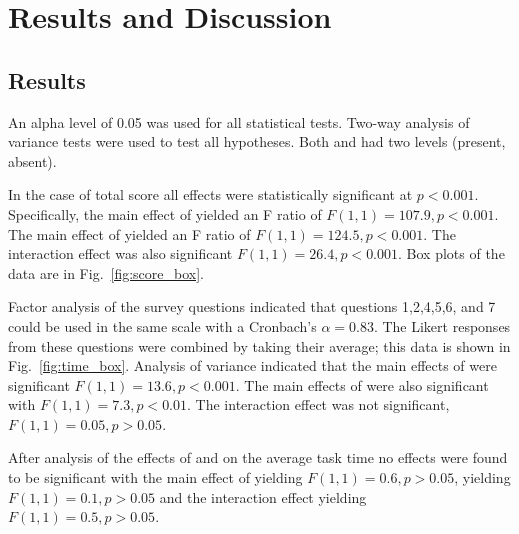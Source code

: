 \section{Results and Discussion} \label{sec:results}
\subsection{Results}
An alpha level of 0.05 was used for all statistical tests. Two-way analysis of variance tests were used to test all hypotheses. Both \xQ{} and \xO had two levels (present, absent).

In the case of total score all effects were statistically significant at $p<0.001$. Specifically, the main effect of \xQ{} yielded an F ratio of $F(1,1)=107.9, p<0.001$. The main effect of \xO{} yielded an F ratio of $F(1,1)=124.5,p<0.001$. The interaction effect was also significant $F(1,1)=26.4,p<0.001$. Box plots of the data are in Fig.~\ref{fig:score_box}.

Factor analysis of the survey questions indicated that questions 1,2,4,5,6, and 7 could be used in the same scale with a Cronbach's $\alpha = 0.83$. The Likert responses from these questions were combined by taking their average; this data is shown in Fig.~\ref{fig:time_box}. Analysis of variance indicated that the main effects of \xQ{} were significant $F(1,1)=13.6,p<0.001$. The main effects of \xO{} were also significant with $F(1,1)=7.3,p<0.01$. The interaction effect was not significant, $F(1,1)=0.05,p>0.05$.

After analysis of the effects of \xQ{} and \xO{} on the average task time no effects were found to be significant with the main effect of \xQ{} yielding $F(1,1)=0.6,p>0.05$, \xO{} yielding $F(1,1)=0.1,p>0.05$ and the interaction effect yielding $F(1,1)=0.5,p>0.05$.

